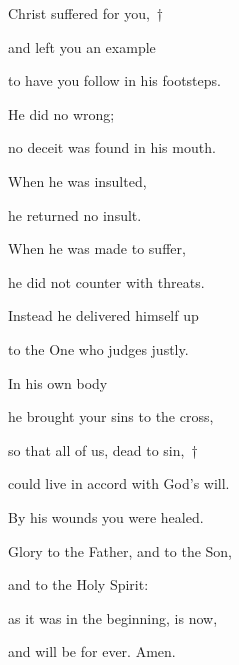 \noindent Christ suffered for you,~†~\nopagebreak

and left you an example ~\GreStar{}~\nopagebreak

to have you follow in his footsteps.

\noindent He did no wrong; ~\GreStar{}~\nopagebreak

no deceit was found in his mouth.

\noindent When he was insulted, ~\GreStar{}~\nopagebreak

he returned no insult.

\noindent When he was made to suffer, ~\GreStar{}~\nopagebreak

he did not counter with threats.

\noindent Instead he delivered himself up ~\GreStar{}~\nopagebreak

to the One who judges justly.

\noindent In his own body ~\GreStar{}~\nopagebreak

he brought your sins to the cross,

\noindent so that all of us, dead to sin,~†~\nopagebreak

could live in accord with God’s will. ~\GreStar{}~\nopagebreak

By his wounds you were healed.

\noindent Glory to the Father, and to the Son,~\GreStar{}~\nopagebreak

and to the Holy Spirit:

\noindent as it was in the beginning, is now,~\GreStar{}~\nopagebreak

and will be for ever. Amen.
